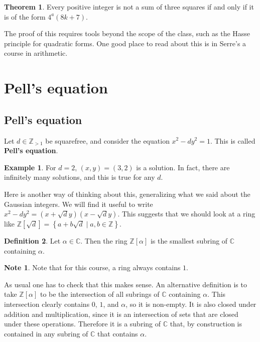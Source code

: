 \documentclass{article}
\newcommand{\Z}{\mathbb{Z}}
\newcommand{\C}{\mathbb{C}}
\newcommand{\rb}[1]{\left( #1 \right)}
\renewcommand{\sb}[1]{\left[ #1 \right]}
\newcommand{\cb}[1]{\left\{ #1 \right\}}
\theoremstyle{definition}\newtheorem{definition}{Definition}
\theoremstyle{definition}\newtheorem{remark}[definition]{Remark}
\theoremstyle{definition}\newtheorem*{example}{Example}
\theoremstyle{definition}\newtheorem*{note}{Note}
\newtheorem{theorem}[definition]{Theorem}
\begin{document}
\begin{theorem}
Every positive integer is not a sum of three squares if and only if it is of the form $ 4^a\rb{8k + 7} $.
\end{theorem}

The proof of this requires tools beyond the scope of the class, such as the Hasse principle for quadratic forms. One good place to read about this is in Serre's a course in arithmetic.

\section{Pell's equation}

\subsection{Pell's equation}

Let $ d \in \Z_{> 1} $ be squarefree, and consider the equation $ x^2 - dy^2 = 1 $. This is called \textbf{Pell's equation}.

\begin{example}
For $ d = 2 $, $ \rb{x, y} = \rb{3, 2} $ is a solution. In fact, there are infinitely many solutions, and this is true for any $ d $.
\end{example}

Here is another way of thinking about this, generalizing what we said about the Gaussian integers. We will find it useful to write $ x^2 - dy^2 = \rb{x + \sqrt{d}y}\rb{x - \sqrt{d}y} $. This suggests that we should look at a ring like $ \Z\sb{\sqrt{d}} = \cb{a + b\sqrt{d} \mid a, b \in \Z} $.

\begin{definition}
Let $ \alpha \in \C $. Then the ring $ \Z\sb{\alpha} $ is the smallest subring of $ \C $ containing $ \alpha $.
\end{definition}

\begin{note}
Note that for this course, a ring always contains $ 1 $.
\end{note}

As usual one has to check that this makes sense. An alternative definition is to take $ \Z\sb{\alpha} $ to be the intersection of all subrings of $ \C $ containing $ \alpha $. This intersection clearly contains $ 0 $, $ 1 $, and $ \alpha $, so it is non-empty. It is also closed under addition and multiplication, since it is an intersection of sets that are closed under these operations. Therefore it is a subring of $ \C $ that, by construction is contained in any subring of $ \C $ that contains $ \alpha $.
\end{document}
